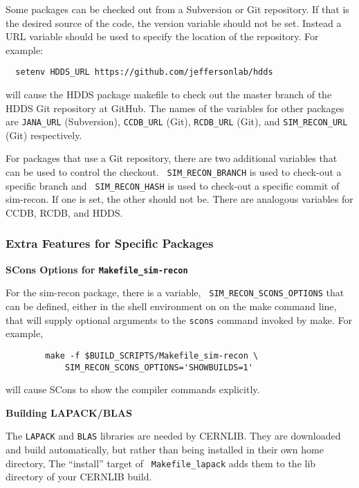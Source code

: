 \documentclass[12pt]{article}
\begin{document}
Some packages can be checked out from a Subversion or Git
repository. If that is the desired source of the code, the version
variable should not be set. Instead a URL variable should be used to
specify the location of the repository. For example:

\begin{verbatim}
  setenv HDDS_URL https://github.com/jeffersonlab/hdds
\end{verbatim}

will cause the HDDS package makefile to check out the master branch of
the HDDS Git repository at GitHub. The names of the variables for
other packages are {\tt JANA\_URL} (Subversion), {\tt CCDB\_URL}
(Git), {\tt RCDB\_URL} (Git), and {\tt SIM\_RECON\_URL} (Git)
respectively.

For packages that use a Git repository, there are two additional
variables that can be used to control the checkout. {\tt
  SIM\_RECON\_BRANCH} is used to check-out a specific branch and {\tt
  SIM\_RECON\_HASH} is used to check-out a specific commit of
sim-recon. If one is set, the other should not be. There are analogous
variables for CCDB, RCDB, and HDDS.

\subsubsection{Extra Features for Specific Packages}\label{section:makefile-extras}

\begin{description}

\item{\bf SCons Options for {\tt Makefile\_sim-recon}}

For the sim-recon package, there is a variable, {\tt
  SIM\_RECON\_SCONS\_OPTIONS} that can be defined, either in the shell
environment on on the make command line, that will supply optional
arguments to the {\tt scons} command invoked by make. For example,
\begin{verbatim}
        make -f $BUILD_SCRIPTS/Makefile_sim-recon \
            SIM_RECON_SCONS_OPTIONS='SHOWBUILDS=1'
\end{verbatim}
will cause SCons to show the compiler commands explicitly.

\item{\bf Building LAPACK/BLAS}

The {\tt LAPACK} and {\tt BLAS} libraries are needed by CERNLIB. They
are downloaded and build automatically, but rather than being
installed in their own home directory, The ``install'' target of {\tt
  Makefile\_lapack} adds them to the lib directory of your CERNLIB
build.

\end{description}
\end{document}
